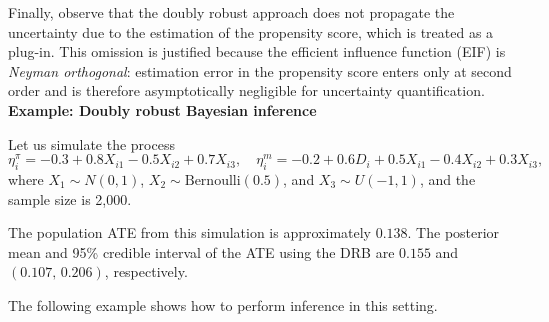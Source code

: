 Finally, observe that the doubly robust approach does not propagate the uncertainty due to the estimation of the propensity score, which is treated as a plug-in. This omission is justified because the efficient influence function (EIF) is \textit{Neyman orthogonal}: estimation error in the propensity score enters only at second order and is therefore asymptotically negligible for uncertainty quantification.\\

\textbf{Example: Doubly robust Bayesian inference}

Let us simulate the process 
\[
\eta^{\pi}_i = -0.3 + 0.8X_{i1} - 0.5X_{i2} + 0.7X_{i3}, 
\quad 
\eta^{m}_i = -0.2 + 0.6D_i + 0.5X_{i1} - 0.4X_{i2} + 0.3X_{i3},
\]
where $X_{1}\sim N(0,1)$, $X_{2}\sim \mathrm{Bernoulli}(0.5)$, and $X_{3}\sim U(-1,1)$, and the sample size is 2,000.
 
The population ATE from this simulation is approximately $0.138$. The posterior mean and 95\% credible interval of the ATE using the DRB are $0.155$ and $(0.107,\,0.206)$, respectively. 

The following example shows how to perform inference in this setting.

